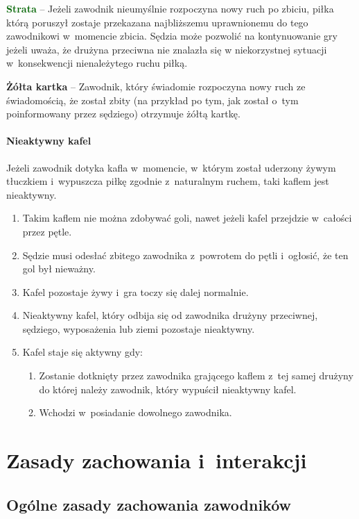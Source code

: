 \documentclass[12pt,a4paper]{article}
\newcommand\yellowcard[1]{\bgroup\textcolor{darkyellow}{\textbf{#1}}}
\newcommand\other[1]{\bgroup\textcolor{darkgreen}{\textbf{#1}}}
\begin{document}
\other{Strata} -- Jeżeli zawodnik nieumyślnie rozpoczyna nowy ruch po
zbiciu, piłka którą poruszył zostaje przekazana najbliższemu
uprawnionemu do tego zawodnikowi w~momencie zbicia. Sędzia może pozwolić
na kontynuowanie gry jeżeli uważa, że drużyna przeciwna nie znalazła się
w niekorzystnej sytuacji w~konsekwencji nienależytego ruchu piłką.

\yellowcard{Żółta kartka} -- Zawodnik, który świadomie rozpoczyna nowy ruch ze
świadomością, że został zbity (na przykład po tym, jak został o~tym
poinformowany przez sędziego) otrzymuje żółtą kartkę.

\paragraph{Nieaktywny kafel}
Jeżeli zawodnik dotyka kafla w~momencie, w~którym został uderzony żywym tłuczkiem i~wypuszcza piłkę
zgodnie z~naturalnym ruchem, taki kaflem jest nieaktywny.

\begin{enumerate}
	\item
	      Takim kaflem nie można zdobywać goli, nawet jeżeli kafel przejdzie w~całości przez pętle.
	\item
	      Sędzie musi odesłać zbitego zawodnika z~powrotem do pętli i~ogłosić,
	      że ten gol był nieważny.
	\item
	      Kafel pozostaje żywy i~gra toczy się dalej normalnie.
	\item
	      Nieaktywny kafel, który odbija się od zawodnika drużyny przeciwnej,
	      sędziego, wyposażenia lub ziemi pozostaje nieaktywny.
	\item
	      Kafel staje się aktywny gdy:

	      \begin{enumerate}
		      \item
		            Zostanie dotknięty przez zawodnika grającego kaflem z~tej samej
		            drużyny do której należy zawodnik, który wypuścił nieaktywny kafel.
		      \item
		            Wchodzi w~posiadanie dowolnego zawodnika.
	      \end{enumerate}
\end{enumerate}

\pagebreak
\section{Zasady zachowania i~interakcji}

\subsection{Ogólne zasady zachowania zawodników}
\end{document}

